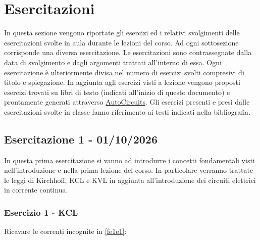 \documentclass[../main.tex]{subfiles}
\begin{document}
\clearpage
\thispagestyle{empty}
\vspace*{7cm}
\section{Esercitazioni}
\vspace*{1.5cm}

In questa sezione vengono riportate gli esercizi ed i relativi svolgimenti delle esercitazioni svolte in aula durante le lezioni del corso. Ad ogni sottosezione corrisponde una diversa esercitazione. Le esercitazioni sono contrassegnate dalla data di svolgimento e dagli argomenti trattati all'interno di essa. Ogni esercitazione è ulteriormente divisa nel numero di esercizi svolti compresivi di titolo e spiegazione. In aggiunta agli esercizi visti a lezione vengono proposti esercizi trovati su libri di testo (indicati all'inizio di questo documento) e prontamente generati attraverso \href{https://autocircuits.org/autocir_run.php?q=shuffle}{AutoCircuits}. Gli esercizi presenti e presi dalle esercitazioni svolte in classe fanno riferimento ai testi indicati nella bibliografia.


\vspace*{1.5cm}
\subsection{Esercitazione 1 - 01/10/2026}


In questa prima esercitazione si vanno ad introdurre i concetti fondamentali visti nell'introduzione e nella prima lezione del corso. In particolare verranno trattate le leggi di Kirchhoff, KCL e KVL in aggiunta all'introduzione dei circuiti elettrici in corrente continua.


\vspace*{1.5cm}
\subsubsection{Esercizio 1 - KCL}
\label{e1e1}

Ricavare le correnti incognite in \ref{fe1e1}:
\end{document}
